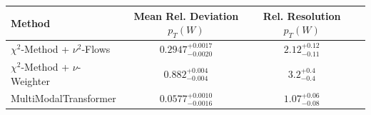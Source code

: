     \begin{tabular}{lccc}
        \toprule
        Method & Mean Rel. Deviation $p_{T}(W)$ & Rel. Resolution $p_{T}(W)$ \\
        \midrule
        $\chi^2$-Method + $\nu^2$-Flows & $0.2947^{+0.0017}_{-0.0020}$ & $2.12^{+0.12}_{-0.11}$ \\
        $\chi^2$-Method + $\nu$-Weighter & $0.882^{+0.004}_{-0.004}$ & $3.2^{+0.4}_{-0.4}$ \\
        MultiModalTransformer & $0.0577^{+0.0010}_{-0.0016}$ & $1.07^{+0.06}_{-0.08}$ \\
        \bottomrule
    \end{tabular}